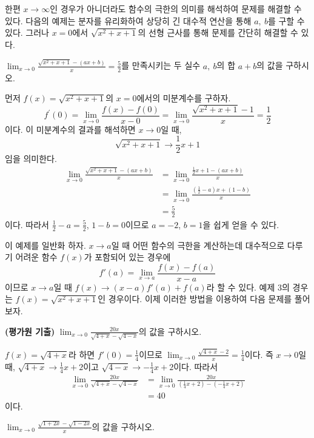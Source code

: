 \documentclass[11pt, a4paper]{book}
\begin{document}
한편 $x\to\infty$인 경우가 아니더라도 함수의 극한의 의미를 해석하여 문제를 해결할 수 있다. 다음의 예제는 분자를 유리화하여 상당히 긴 대수적 연산을 통해 $a,\: b$를 구할 수 있다. 그러나 $x=0$에서 $\sqrt{x^{2}+x+1}$의 선형 근사를 통해 문제를 간단히 해결할 수 있다.
\vskip 10pt

\begin{example}
$\displaystyle\lim_{x\to 0}\frac{\sqrt{x^{2}+x+1}-(ax+b)}{x}=\frac{5}{2}$를 만족시키는 두 실수 $a,\: b$의 합 $a+b$의 값을 구하시오.
\begin{solution}
	먼저 $f(x)=\sqrt{x^{2}+x+1}$의 $x =0$에서의 미분계수를 구하자. 
	\[
	f^{\prime}(0)=\displaystyle\lim_{x\to 0}\frac{f(x)-f(0)}{x-0}=\displaystyle\lim_{x\to 0}\frac{\sqrt{x^{2}+x+1}-1}{x}=\frac{1}{2}
	\]
	이다. 이 미분계수의 결과를 해석하면 $x\to 0$일 때, 
	\[
	\sqrt{x^{2}+x+1}\to\frac{1}{2}x +1
	\]
	임을 의미한다. 
	\begin{align*}
		\displaystyle\lim_{x\to 0}\frac{\sqrt{x^{2}+x+1}-(ax+b)}{x}
		& =\displaystyle\lim_{x\to 0}\frac{\frac{1}{2}x+1-(ax+b)}{x}\\
		& =\displaystyle\lim_{x\to 0}\frac{\left(\frac{1}{2}-a\right)x+(1-b)}{x}\\
		&=\frac{5}{2}
	\end{align*}
	이다. 따라서 $\frac{1}{2}-a =\frac{5}{2}$, $1-b =0$이므로 $a = -2$, $b =1$을 쉽게 얻을 수 있다.
\end{solution}
\end{example}
\vskip 10pt

이 예제를 일반화 하자. $x\to a$일 때 어떤 함수의 극한을 계산하는데 대수적으로 다루기 어려운 함수 $f(x)$가 포함되어 있는 경우에
\[
f'(a)=\displaystyle\lim_{x\to a}\frac{f(x)-f(a)}{x-a}
\]
이므로 $x\to a$일 때 $f(x)\to(x-a)f'(a)+f(a)$라 할 수 있다. 예제 3의 경우는 $f(x)=\sqrt{x^{2}+x+1}$인 경우이다. 이제 이러한 방법을 이용하여 다음 문제를 풀어보자.
\vskip 10pt
\begin{example}
\textbf{(평가원 기출)} $\displaystyle\lim_{x\to 0}\frac{20x}{\sqrt{4+x}-\sqrt{4-x}}$의 값을 구하시오.
\begin{solution}
	$f(x)=\sqrt{4+x}$라 하면 $f'(0)=\frac{1}{4}$이므로 $\displaystyle\lim_{x\to 0}\frac{\sqrt{4+x}-2}{x}=\frac{1}{4}$이다. 즉 $x\to 0$일 때, $\sqrt{4+x}\to\frac{1}{4}x +2$이고 $\sqrt{4-x}\to -\frac{1}{4}x+2$이다. 따라서
	\begin{align*}
		\displaystyle\lim_{x\to 0}\frac{20x}{\sqrt{4+x}-\sqrt{4-x}}&=\displaystyle\lim_{x\to 0}\frac{20x}{\left(\frac{1}{4}x+2\right)-\left(-\frac{1}{4}x+2\right)}\\
		&=40
	\end{align*}
	이다.
\end{solution}
\end{example}
\vskip 10pt
\begin{problem} $\displaystyle\lim_{x\to 0}\frac{\sqrt{1+2x}-\sqrt{1-2x}}{x}$의 값을 구하시오.
\end{problem} 
\end{document}
